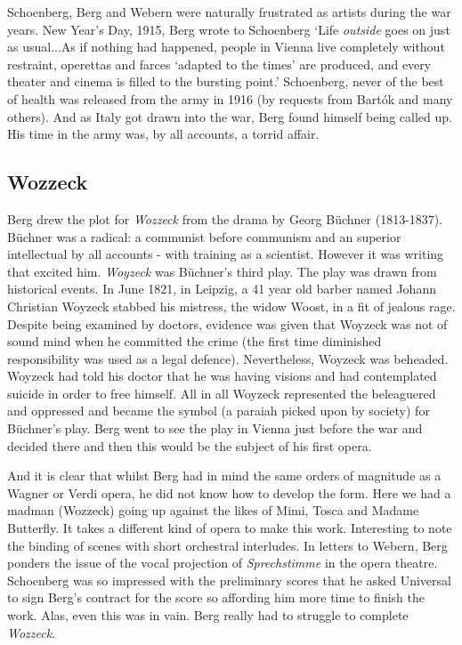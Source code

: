 Schoenberg, Berg and Webern were naturally frustrated as artists during the war years. New Year's Day, 1915, Berg wrote to Schoenberg `Life \textit{outside} goes on just as usual...As if nothing had happened, people in Vienna live completely without restraint, operettas and farces `adapted to the times' are produced, and every theater and cinema is filled to the bursting point.' Schoenberg, never of the best of health was released from the army in 1916 (by requests from Bart\'ok and many others). And as Italy got drawn into the war, Berg found himself being called up. His time in the army was, by all accounts, a torrid affair.  

\subsection{Wozzeck}
Berg drew the plot for \textit{Wozzeck} from the drama by Georg B\"uchner (1813-1837). B\"uchner was a radical: a communist before communism and an superior intellectual by all accounts - with training as a scientist. However it was writing that excited him. \textit{Woyzeck} was B\"uchner's third play. The play was drawn from historical events. In June 1821, in Leipzig, a 41 year old barber named Johann Christian Woyzeck stabbed his mistress, the widow Woost, in a fit of jealous rage. Despite being examined by doctors, evidence was given that Woyzeck was not of sound mind when he committed the crime (the first time diminished responsibility was used as a legal defence). Nevertheless, Woyzeck was beheaded. Woyzeck had told his doctor that he was having visions and had contemplated suicide in order to free himself. All in all Woyzeck represented the beleaguered and oppressed and became the symbol (a paraiah picked upon by society) for B\"uchner's play. Berg went to see the play in Vienna just before the war and decided there and then this would be the subject of his first opera.

And it is clear that whilst Berg had in mind the same orders of magnitude as a Wagner or Verdi opera, he did not know how to develop the form. Here we had a madman (Wozzeck) going up against the likes of Mimi, Tosca and Madame Butterfly. It takes a different kind of opera to make this work. Interesting to note the binding of scenes with short orchestral interludes. In letters to Webern, Berg ponders the issue of the vocal projection of \textit{Sprechstimme} in the opera theatre. Schoenberg was so impressed with the preliminary scores that he asked Universal to sign Berg's contract for the score so affording him more time to finish the work. Alas, even this was in vain. Berg really had to struggle to complete \textit{Wozzeck}. 


